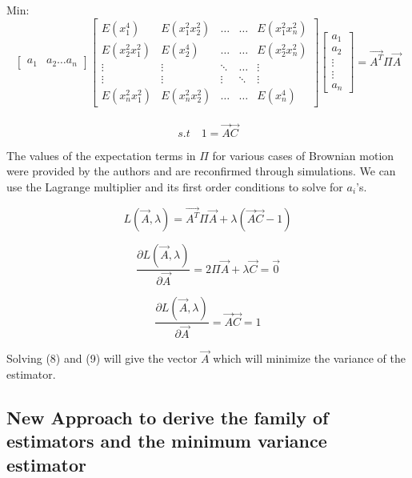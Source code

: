 \documentclass[12pt]{article}   	%
\begin{document}
Min:$$
	 \begin{bmatrix}
		a_1 & a_2  \dots a_n
	\end{bmatrix} 
	\begin{bmatrix}
	E(x_1^4)&E(x_1^2 x_2^2)&\dots&\dots&E(x_1^2 x_n^2)\\
	E(x_2^2 x_1^2)& E(x_2^4)&\dots&\dots&E(x_2^2 x_n^2)\\
	\vdots&\vdots&\ddots&\dots&\vdots\\
	\vdots&\vdots&\vdots&\ddots&\vdots\\
	E(x_n^2 x_1^2)&E(x_n^2 x_2^2)&\dots&\dots&E(x_n^4)
	\end{bmatrix}
	\begin{bmatrix}
		a_1\\
		a_2\\
		\vdots\\
		\vdots\\
		a_n 
	\end{bmatrix} =  \vec{A^T}\Pi\vec{A} $$ \\
	\begin{equation}
	s.t\quad  1= \vec{A}\vec{C}
\end{equation}


The values of the expectation terms in $\Pi$ for various cases of Brownian motion were provided by the authors and are reconfirmed through simulations. 
We can use the Lagrange multiplier and its first order conditions to solve for $a_i$'s.

\begin{equation}
L(\vec{A},\lambda)=\vec{A^T}  \Pi \vec{A} + \lambda( \vec{A}\vec{C}-1)
\end{equation}

\begin{equation}
	\frac{\partial L(\vec{A},\lambda)}{\partial \vec{A}} = 2\Pi\vec{A}+\lambda \vec{C}=\vec{0} 
	\end{equation}

\begin{equation}
\frac{\partial L(\vec{A},\lambda)}{\partial \vec{A}} = \vec{A}\vec{C}=1
\end{equation}


Solving (8) and (9) will give the vector $\vec{A}$ which will minimize the variance of the estimator.

\subsection{New Approach to derive the family of estimators and the minimum variance estimator}
\end{document}

